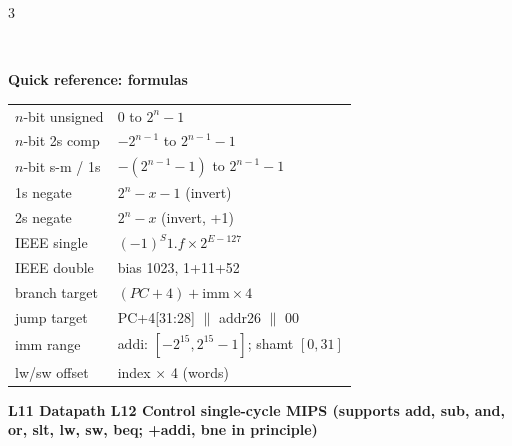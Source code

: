 \documentclass[landscape]{article}
\newcommand{\bigsec}[2]{\colorlet{cur}{#1}%
  \par\vspace{2pt}\noindent\colorbox{cur}{\parbox{\dimexpr\linewidth-2\fboxsep}{\centering\color{white}\bfseries\small #2}}\par\vspace{1pt}}
\newcommand{\sect}[1]{\par\vspace{2pt}\noindent{\color{cur}\rule[-1.5pt]{\linewidth}{0.4pt}}\\[-7.5pt]%
  \noindent\colorbox{cur!12}{\parbox{\dimexpr\linewidth-2\fboxsep}{\color{cur}\bfseries #1}}\par\vspace{0.5pt}}
\begin{document}
\begin{multicols*}{3}
\sect{Quick reference: formulas}
{\fontsize{5.8}{6.6}\selectfont
\begin{tabular}{@{}p{58pt}p{110pt}@{}}\toprule
$n$-bit unsigned & $0$ to $2^n-1$\\
$n$-bit 2s comp & $-2^{n-1}$ to $2^{n-1}-1$\\
$n$-bit s-m / 1s & $-(2^{n-1}-1)$ to $2^{n-1}-1$\\
1s negate & $2^n - x - 1$ (invert)\\
2s negate & $2^n - x$ (invert, +1)\\
IEEE single & $(-1)^S 1.f\times 2^{E-127}$\\
IEEE double & bias 1023, 1+11+52\\
branch target & $(PC+4)+\text{imm}\times4$\\
jump target & PC+4[31:28] $\|$ addr26 $\|$ 00\\
imm range & addi: $[-2^{15},2^{15}-1]$; shamt $[0,31]$\\
lw/sw offset & index $\times$ 4 (words)\\\bottomrule
\end{tabular}}
\end{multicols*}
\newpage
{}
\bigsec{secD}{L11 Datapath \;\textbar\; L12 Control \;\textbar\; single-cycle MIPS (supports add, sub, and, or, slt, lw, sw, beq; +addi, bne in principle)}
\vspace{2pt}
\noindent
\end{document}
